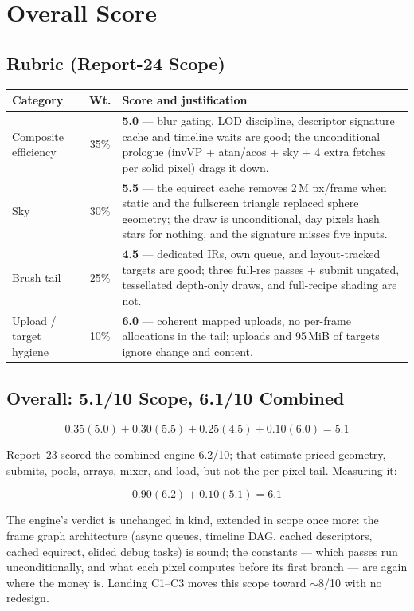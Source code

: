 \documentclass[11pt,a4paper]{article}
\begin{document}
\section{Overall Score}
\label{sec:score24}

\subsection{Rubric (Report-24 Scope)}

\begin{table}[h]
\centering
\small
\begin{tabular}{@{}lcp{7.2cm}@{}}
\toprule
\textbf{Category} & \textbf{Wt.} & \textbf{Score and justification} \\
\midrule
Composite efficiency & 35\% & \textbf{5.0} --- blur gating, LOD discipline,
descriptor signature cache and timeline waits are good; the unconditional
prologue (invVP + atan/acos + sky + 4 extra fetches per solid pixel) drags
it down. \\
Sky & 30\% & \textbf{5.5} --- the equirect cache removes 2\,M px/frame when
static and the fullscreen triangle replaced sphere geometry; the draw is
unconditional, day pixels hash stars for nothing, and the signature misses
five inputs. \\
Brush tail & 25\% & \textbf{4.5} --- dedicated IRs, own queue, and
layout-tracked targets are good; three full-res passes + submit ungated,
tessellated depth-only draws, and full-recipe shading are not. \\
Upload / target hygiene & 10\% & \textbf{6.0} --- coherent mapped uploads,
no per-frame allocations in the tail; uploads and 95\,MiB of targets ignore
change and content. \\
\bottomrule
\end{tabular}
\end{table}

\subsection{Overall: 5.1/10 Scope, 6.1/10 Combined}

\begin{equation}
0.35(5.0) + 0.30(5.5) + 0.25(4.5) + 0.10(6.0) = \mathbf{5.1}
\end{equation}

Report~23 scored the combined engine 6.2/10; that estimate priced geometry,
submits, pools, arrays, mixer, and load, but not the per-pixel tail.
Measuring it:

\begin{equation}
0.90(6.2) + 0.10(5.1) = \mathbf{6.1}
\end{equation}

The engine's verdict is unchanged in kind, extended in scope once more: the
frame graph architecture (async queues, timeline DAG, cached descriptors,
cached equirect, elided debug tasks) is sound; the constants --- which
passes run unconditionally, and what each pixel computes before its first
branch --- are again where the money is. Landing C1--C3 moves this scope
toward $\sim$8/10 with no redesign.
\end{document}

